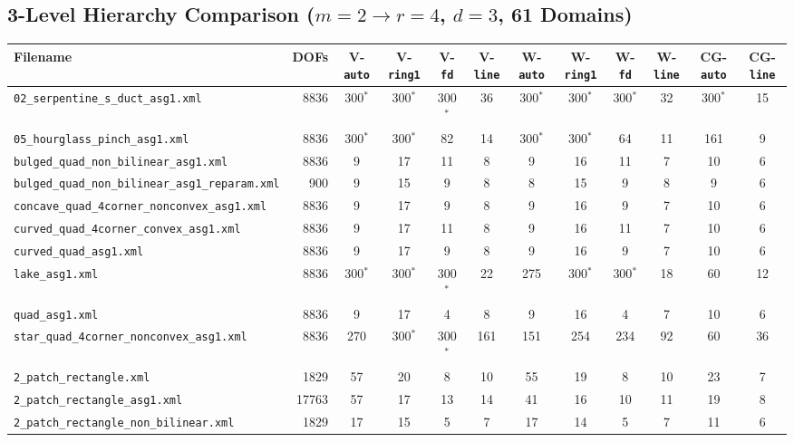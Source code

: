 \documentclass[10pt,a4paper]{article}
\begin{document}
\subsection{3-Level Hierarchy Comparison ($m=2\to r=4$, $d=3$, 61 Domains)}
{\tiny
\setlength{\tabcolsep}{2.5pt}
\begin{longtable}{@{}lrcccccccccc@{}}
\toprule
\textbf{Filename} & \textbf{DOFs} & \textbf{V-\texttt{auto}} & \textbf{V-\texttt{ring1}} & \textbf{V-\texttt{fd}} & \textbf{V-\texttt{line}} & \textbf{W-\texttt{auto}} & \textbf{W-\texttt{ring1}} & \textbf{W-\texttt{fd}} & \textbf{W-\texttt{line}} & \textbf{CG-\texttt{auto}} & \textbf{CG-\texttt{line}} \\
\midrule
\endhead
\texttt{02\_serpentine\_s\_duct\_asg1.xml} & 8836 & 300$^*$ & 300$^*$ & 300$^*$ & 36 & 300$^*$ & 300$^*$ & 300$^*$ & 32 & 300$^*$ & 15 \\
\texttt{05\_hourglass\_pinch\_asg1.xml} & 8836 & 300$^*$ & 300$^*$ & 82 & 14 & 300$^*$ & 300$^*$ & 64 & 11 & 161 & 9 \\
\texttt{bulged\_quad\_non\_bilinear\_asg1.xml} & 8836 & 9 & 17 & 11 & 8 & 9 & 16 & 11 & 7 & 10 & 6 \\
\texttt{bulged\_quad\_non\_bilinear\_asg1\_reparam.xml} & 900 & 9 & 15 & 9 & 8 & 8 & 15 & 9 & 8 & 9 & 6 \\
\texttt{concave\_quad\_4corner\_nonconvex\_asg1.xml} & 8836 & 9 & 17 & 9 & 8 & 9 & 16 & 9 & 7 & 10 & 6 \\
\texttt{curved\_quad\_4corner\_convex\_asg1.xml} & 8836 & 9 & 17 & 11 & 8 & 9 & 16 & 11 & 7 & 10 & 6 \\
\texttt{curved\_quad\_asg1.xml} & 8836 & 9 & 17 & 9 & 8 & 9 & 16 & 9 & 7 & 10 & 6 \\
\texttt{lake\_asg1.xml} & 8836 & 300$^*$ & 300$^*$ & 300$^*$ & 22 & 275 & 300$^*$ & 300$^*$ & 18 & 60 & 12 \\
\texttt{quad\_asg1.xml} & 8836 & 9 & 17 & 4 & 8 & 9 & 16 & 4 & 7 & 10 & 6 \\
\texttt{star\_quad\_4corner\_nonconvex\_asg1.xml} & 8836 & 270 & 300$^*$ & 300$^*$ & 161 & 151 & 254 & 234 & 92 & 60 & 36 \\
\texttt{2\_patch\_rectangle.xml} & 1829 & 57 & 20 & 8 & 10 & 55 & 19 & 8 & 10 & 23 & 7 \\
\texttt{2\_patch\_rectangle\_asg1.xml} & 17763 & 57 & 17 & 13 & 14 & 41 & 16 & 10 & 11 & 19 & 8 \\
\texttt{2\_patch\_rectangle\_non\_bilinear.xml} & 1829 & 17 & 15 & 5 & 7 & 17 & 14 & 5 & 7 & 11 & 6 \\

\end{longtable}}
\end{document}
